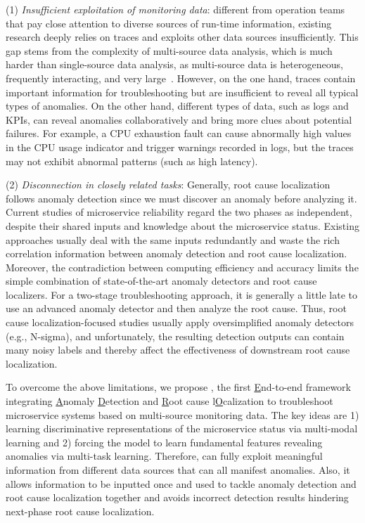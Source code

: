 (1) \textit{Insufficient exploitation of monitoring data}:
different from operation teams that pay close attention to diverse sources of run-time information, existing research deeply relies on traces and exploits other data sources insufficiently. 
This gap stems from the complexity of multi-source data analysis, which is much harder than single-source data analysis, as multi-source data is heterogeneous, frequently interacting, and very large~\cite{Multisource}.
However, on the one hand, traces contain important information for troubleshooting but are insufficient to reveal all typical types of anomalies.
On the other hand, different types of data, such as logs and KPIs, can reveal anomalies collaboratively and bring more clues about potential failures.
For example, a CPU exhaustion fault can cause abnormally high values in the CPU usage indicator and trigger warnings recorded in logs, but the traces may not exhibit abnormal patterns (such as high latency).

(2) \textit{Disconnection in closely related tasks}:
Generally, root cause localization follows anomaly detection since we must discover an anomaly before analyzing it.
Current studies of microservice reliability regard the two phases as independent, despite their shared inputs and knowledge about the microservice status. Existing approaches usually deal with the same inputs redundantly and waste the rich correlation information between anomaly detection and root cause localization.
Moreover, the contradiction between computing efficiency and accuracy limits the simple combination of state-of-the-art anomaly detectors and root cause localizers.
For a two-stage troubleshooting approach, it is generally a little late to use an advanced anomaly detector and then analyze the root cause.
Thus, root cause localization-focused studies usually apply oversimplified anomaly detectors (e.g., N-sigma), and unfortunately, the resulting detection outputs can contain many noisy labels and thereby affect the effectiveness of downstream root cause localization. 

To overcome the above limitations, we propose \textbf{\name}, the first \underline{E}nd-to-end framework integrating \underline{A}nomaly \underline{D}etection and \underline{R}oot cause l\underline{O}calization to troubleshoot microservice systems based on multi-source monitoring data.
The key ideas are 1) learning discriminative representations of the microservice status via multi-modal learning and 2) forcing the model to learn fundamental features revealing anomalies via multi-task learning.
Therefore, \name can fully exploit meaningful information from different data sources that can all manifest anomalies. Also, it allows information to be inputted once and used to tackle anomaly detection and root cause localization together and avoids incorrect detection results hindering next-phase root cause localization.


